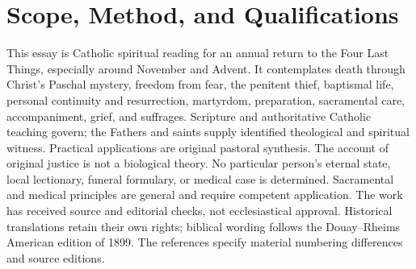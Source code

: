 \section{Scope, Method, and Qualifications}
This essay is Catholic spiritual reading for an annual return to the Four Last Things, especially around November and Advent. It contemplates death through Christ's Paschal mystery, freedom from fear, the penitent thief, baptismal life, personal continuity and resurrection, martyrdom, preparation, sacramental care, accompaniment, grief, and suffrages. Scripture and authoritative Catholic teaching govern; the Fathers and saints supply identified theological and spiritual witness. Practical applications are original pastoral synthesis. The account of original justice is not a biological theory. No particular person's eternal state, local lectionary, funeral formulary, or medical case is determined. Sacramental and medical principles are general and require competent application. The work has received source and editorial checks, not ecclesiastical approval. Historical translations retain their own rights; biblical wording follows the Douay--Rheims American edition of 1899. The references specify material numbering differences and source editions.
